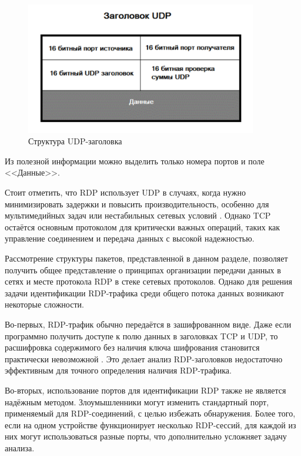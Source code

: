 \documentclass[spec, och, diploma]{SCWorks}
\begin{document}
\begin{figure}[H]
  \centering
  \includegraphics[width=0.9\textwidth]{pics/udp-segment.png}
  \caption{Структура UDP-заголовка}
  \label{udp-header}
\end{figure}

Из полезной информации можно выделить только номера портов и поле <<Данные>>.

Стоит отметить, что RDP использует UDP в случаях, когда нужно минимизировать задержки и повысить производительность, особенно для мультимедийных 
задач или нестабильных сетевых условий \cite{udpseg}. Однако TCP остаётся основным протоколом для критически важных операций, таких как 
управление соединением и передача данных с высокой надежностью.

Рассмотрение структуры пакетов, представленной в данном разделе, позволяет получить общее представление о принципах организации передачи данных в сетях и месте 
протокола RDP в стеке сетевых протоколов. Однако для решения задачи идентификации RDP-трафика среди общего потока данных возникают некоторые сложности.

Во-первых, RDP-трафик обычно передаётся в зашифрованном виде. Даже если программно получить доступе к полю данных в заголовках TCP и UDP, то расшифровка 
содержимого без наличия ключа шифрования становится практически невозможной \cite{lib5}. Это делает анализ RDP-заголовков недостаточно эффективным для точного 
определения наличия RDP-трафика.

Во-вторых, использование портов для идентификации RDP также не является надёжным методом. Злоумышленники могут изменить стандартный порт, 
применяемый для RDP-соединений, с целью избежать обнаружения. Более того, если на одном устройстве функционирует несколько RDP-сессий, для каждой 
из них могут использоваться разные порты, что дополнительно усложняет задачу анализа.
\end{document}
